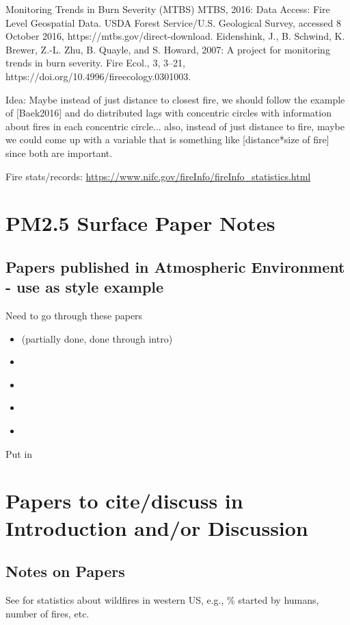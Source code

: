 Monitoring Trends in Burn Severity (MTBS) MTBS, 2016: Data Access: Fire Level Geospatial Data. USDA Forest Service/U.S. Geological Survey, accessed 8 October 2016, https://mtbs.gov/direct-download. 
Eidenshink, J., B. Schwind, K. Brewer, Z.-L. Zhu, B. Quayle, and S. Howard, 2007: A project for monitoring trends in burn severity. Fire Ecol., 3, 3–21, https://doi.org/10.4996/fireecology.0301003. 

Idea: Maybe instead of just distance to closest fire, we should follow the example of [Baek2016] and do distributed lags with concentric circles with information about fires in each concentric circle... also, instead of just distance to fire, maybe we could come up with a variable that is something like [distance*size of fire] since both are important.

Fire stats/records: \url{https://www.nifc.gov/fireInfo/fireInfo_statistics.html}

\section{PM2.5 Surface Paper Notes}

\subsection{Papers published in Atmospheric Environment - use as style example}

Need to go through these papers
\begin{itemize}
\item \cite{BrokampExposure2017} (partially done, done through intro)
\item \cite{Sampson2013}
\item \cite{Anyenda2016}
\item \cite{Torvela2014}
\item \cite{Whiteman2014}
\end{itemize}

Put in \cite{BrokampExposure2017,larsen_impacts_2017}

\section{Papers to cite/discuss in Introduction and/or Discussion}

\cite{westerling_increasing_2016,WesterlingCorrection2016}

\subsection{Notes on Papers}

See \cite{Fusco2016} for statistics about wildfires in western US, e.g., \% started by humans, number of fires, etc.
